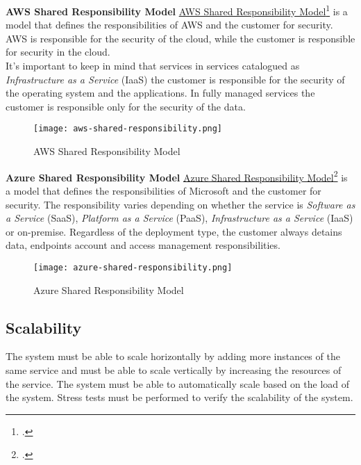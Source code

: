    \newpage
    \textbf{AWS Shared Responsibility Model}
    \href{https://aws.amazon.com/it/compliance/shared-responsibility-model/}{AWS Shared Responsibility Model}\footcite{site:aws-shared-responsibility-model} is a model that defines the responsibilities of AWS and the customer for security. AWS is responsible for the security of the cloud, while the customer is responsible for security in the cloud.\\
    It's important to keep in mind that services in services catalogued as \textit{Infrastructure as a Service} (IaaS) the customer is responsible for the security of the operating system and the applications. In fully managed services the customer is responsible only for the security of the data.\\
    \begin{figure}[htbp]
        \centering
        \texttt{[image: aws-shared-responsibility.png]}
        \caption{AWS Shared Responsibility Model}
    \end{figure}

    \newpage
    \textbf{Azure Shared Responsibility Model}
    \href{https://learn.microsoft.com/en-us/azure/security/fundamentals/shared-responsibility}{Azure Shared Responsibility Model}\footcite{site:azure-shared-responsibility-model} is a model that defines the responsibilities of Microsoft and the customer for security. The responsibility varies depending on whether the service is \textit{Software as a Service} (SaaS), \textit{Platform as a Service} (PaaS), \textit{Infrastructure as a Service} (IaaS) or on-premise. Regardless of the deployment type, the customer always detains data, endpoints account and access management responsibilities.\\
    
    \begin{figure}[htbp]
        \centering
        \texttt{[image: azure-shared-responsibility.png]}
        \caption{Azure Shared Responsibility Model}
    \end{figure}

\subsection{Scalability}
The system must be able to scale horizontally by adding more instances of the same service and must be able to scale vertically by increasing the resources of the service. The system must be able to automatically scale based on the load of the system.
Stress tests must be performed to verify the scalability of the system.\\

